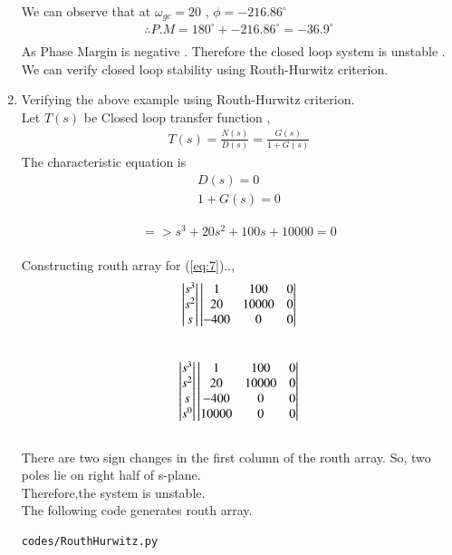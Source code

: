 \begin{enumerate}[label=\thesection.\arabic*.,ref=\thesection.\theenumi]
\begin{figure}[!h]
  \caption{}
  \label{fig:ee18btech11017_1}
\end{figure}
We can observe that at $\omega_{gc}=20$ , $\phi=-216.86^{\circ}$
\\
\begin{align}
\therefore P.M=180^{\circ}+-216.86^{\circ}=-36.9^{\circ} \\
\end{align}
As Phase Margin is negative . Therefore the closed loop system is unstable .
We can verify closed loop stability using Routh-Hurwitz criterion.


\item
Verifying the above example using Routh-Hurwitz criterion.\\
Let $T(s)$ be Closed loop transfer function ,
\begin{align}
T(s)=\frac{N(s)}{D(s)}=\frac{G(s)}{1+G(s)}
\end{align}
The characteristic equation is 
\begin{align}
D(s)=0  \\
1+G(s)=0 
\end{align}

\begin{align}
=> s^{3}+20s^{2}+100s+10000=0   \label{eq:7} 
\end{align}
\\
Constructing routh array for (\ref{eq:7})..,
\begin{align}
\begin{vmatrix}s^3\\s^2\\s\end{vmatrix}
\begin{vmatrix}1 & 100 & 0 \\ 20 & 10000 & 0 \\ -400 & 0 & 0\end{vmatrix}
\end{align}\\

\begin{align}
\begin{vmatrix}s^3\\s^2\\s\\s^0\end{vmatrix}
\begin{vmatrix}1 & 100 & 0 \\ 20 & 10000 & 0 \\ -400 & 0 & 0 \\ 10000 & 0 & 0\end{vmatrix}
\end{align}\\

There are two sign changes in the first column of the routh array. So, two poles lie on right half of s-plane. \\
Therefore,the system is unstable.\\
The following code generates routh array.
\begin{lstlisting}
codes/RouthHurwitz.py
\end{lstlisting}



\end{enumerate}
